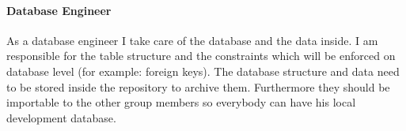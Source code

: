 \paragraph{Database Engineer} As a database engineer I take care of the database and the data inside. I am responsible for the table structure and the constraints which will be enforced on database level (for example: foreign keys).
The database structure and data need to be stored inside the repository to archive them. Furthermore they should be importable to the other group members so everybody can have his local development database. 

